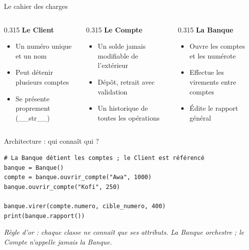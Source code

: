\documentclass[aspectratio=169,11pt]{beamer}
\begin{document}
\begin{frame}{Le cahier des charges}
\begin{columns}[t]
\begin{column}{0.315\textwidth}
{\bfseries\color{PyBleu}Le Client}

\begin{itemize}
  \setlength{\itemsep}{1.5pt}\setlength{\parskip}{0pt}
  \item Un numéro unique et un nom
  \item Peut détenir plusieurs comptes
  \item Se présente proprement (\_\_str\_\_)
\end{itemize}
\end{column}
\hspace{0.015\textwidth}
\begin{column}{0.315\textwidth}
{\bfseries\color{PyBleu}Le Compte}

\begin{itemize}
  \setlength{\itemsep}{1.5pt}\setlength{\parskip}{0pt}
  \item Un solde jamais modifiable de l'extérieur
  \item Dépôt, retrait avec validation
  \item Un historique de toutes les opérations
\end{itemize}
\end{column}
\hspace{0.015\textwidth}
\begin{column}{0.315\textwidth}
{\bfseries\color{PyBleu}La Banque}

\begin{itemize}
  \setlength{\itemsep}{1.5pt}\setlength{\parskip}{0pt}
  \item Ouvre les comptes et les numérote
  \item Effectue les virements entre comptes
  \item Édite le rapport général
\end{itemize}
\end{column}
\end{columns}
\end{frame}

\begin{frame}[fragile]{Architecture : qui connaît qui ?}

\begin{lstlisting}[style=py]
# La Banque détient les comptes ; le Client est référencé
banque = Banque()
compte = banque.ouvrir_compte("Awa", 1000)
banque.ouvrir_compte("Kofi", 250)

banque.virer(compte.numero, cible_numero, 400)
print(banque.rapport())
\end{lstlisting}
\vspace{0.5pt}

{\small\color{PyGris}\itshape Règle d'or : chaque classe ne connaît que ses attributs. La Banque orchestre ; le Compte n'appelle jamais la Banque.}

\end{frame}
\end{document}
